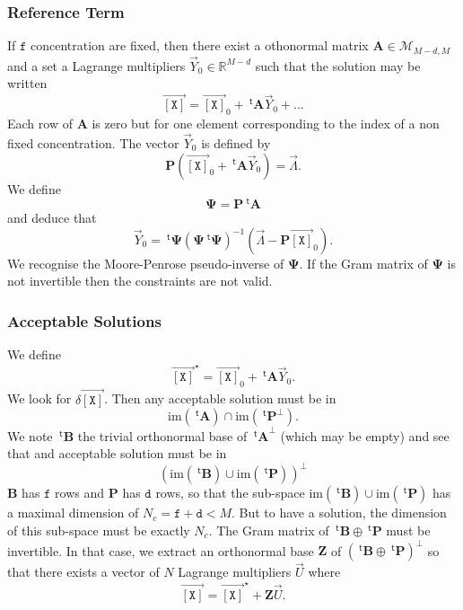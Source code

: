 \documentclass[aps,twocolumn]{revtex4}
\newcommand{\myconc}[1]{\left\lbrack #1 \right\rbrack}
\newcommand{\mychem}[1]{{\mathtt{#1}}}
\newcommand{\mymat}[1]{\boldsymbol{#1}}
\newcommand{\mytrn}[1]{{\!\!~^{\mathsf{t}}{#1}}}
\newcommand{\myvec}[1]{\overrightarrow{#1}}
\newcommand{\vecX}{\myvec{\myconc{\mychem{X}}}}
\newcommand{\dof}{\mathtt{d}}
\newcommand{\fixed}{\mathtt{f}}
\begin{document}
\subsubsection{Reference Term}
If $\fixed$ concentration are fixed, then there exist a othonormal matrix $\mymat{A}\in\mathcal{M}_{M-d,M}$ and
a set a Lagrange multipliers $\vec{Y}_0\in\mathbb{R}^{M-d}$ such that the solution may be written
\begin{equation}
	\vecX = \vecX_0 + \mytrn{\mymat{A}}\vec{Y}_0 + \ldots
\end{equation}
Each row of $\mymat{A}$ is zero but for one element corresponding to the index of a non fixed concentration.
The vector $\vec{Y}_0$ is defined by
$$
	\mymat{P}\left(\vecX_0+\mytrn{\mymat{A}}\vec{Y}_0\right) = \vec\Lambda.
$$
We define
$$
	\mymat{\Psi} = \mymat{P}\mytrn{\mymat{A}}
$$
and deduce that
$$
	\vec{Y}_0 = \mytrn{\mymat{\Psi}} \left(\mymat{\Psi} \mytrn{\mymat{\Psi}}\right)^{-1}\left( \vec{\Lambda} - \mymat{P}\vecX_0\right).
$$
We recognise the Moore-Penrose pseudo-inverse of $\mymat{\Psi}$. If the Gram matrix of $\mymat{\Psi}$ is not invertible then
the constraints are not valid.

\subsubsection{Acceptable Solutions}
We define
$$
	\vecX^\star = \vecX_0 + \mytrn{\mymat{A}}\vec{Y}_0.
$$
We look for $\delta\vecX$.
Then any acceptable solution must be in
$$
	\mathrm{im}(\mytrn{\mymat{A}}) \cap \mathrm{im}(\mytrn{\mymat{P}^\perp}).
$$
We note $\mytrn{\mymat{B}}$ the trivial orthonormal base of  $\mytrn{\mymat{A}}^\perp$ (which may be empty)
and see that and acceptable solution must be in
$$
	\left( 
	\mathrm{im}(\mytrn{\mymat{B}})
	\cup
	\mathrm{im}(\mytrn{\mymat{P}})
	\right)^\perp
$$
$\mymat{B}$ has $\fixed$ rows and $\mymat{P}$ has $\dof$ rows, so that the sub-space $\mathrm{im}(\mytrn{\mymat{B}})
	\cup
	\mathrm{im}(\mytrn{\mymat{P}})$
	has a maximal dimension of $N_c=\fixed+\dof<M$.
But to have a solution, the dimension of this sub-space must be exactly $N_c$.
The Gram matrix of $\mytrn{\mymat{B}} \oplus \mytrn{\mymat{P}}$ must be invertible.
In that case, we extract an orthonormal base $\mymat{Z}$ of  $(\mytrn{\mymat{B}} \oplus \mytrn{\mymat{P}})^\perp$
so that there exists a vector of $N$ Lagrange multipliers $\vec{U}$ where
$$
	\vecX = \vecX^\star + \mymat{Z}\vec{U}.
$$
\end{document}
